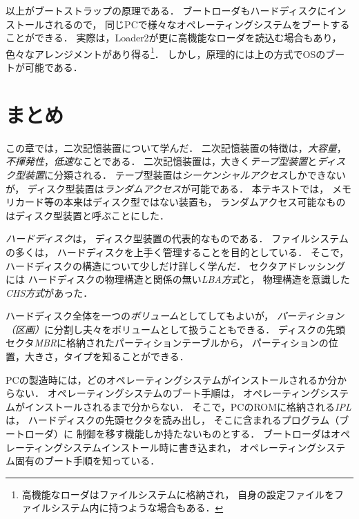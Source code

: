 以上がブートストラップの原理である．
ブートローダもハードディスクにインストールされるので，
同じPCで様々なオペレーティングシステムをブートすることができる．
実際は，Loader2が更に高機能なローダを読込む場合もあり，
色々なアレンジメントがあり得る\footnote{
高機能なローダはファイルシステムに格納され，
自身の設定ファイルをファイルシステム内に持つような場合もある．}．
しかし，原理的には上の方式でOSのブートが可能である．

\section{まとめ}
この章では，二次記憶装置について学んだ．
二次記憶装置の特徴は，\emph{大容量}，
\emph{不揮発性}，\emph{低速}なことである．
二次記憶装置は，大きく\emph{テープ型装置}と\emph{ディスク型装置}に分類される．
テープ型装置は\emph{シーケンシャルアクセス}しかできないが，
ディスク型装置は\emph{ランダムアクセス}が可能である．
本テキストでは，
メモリカード等の本来はディスク型ではない装置も，
ランダムアクセス可能なものはディスク型装置と呼ぶことにした．

\emph{ハードディスク}は，
ディスク型装置の代表的なものである．
ファイルシステムの多くは，
ハードディスクを上手く管理することを目的としている．
そこで，ハードディスクの構造について少しだけ詳しく学んだ．
セクタアドレッシングには
ハードディスクの物理構造と関係の無い\emph{LBA方式}と，
物理構造を意識した\emph{CHS方式}があった．

ハードディスク全体を一つの\emph{ボリューム}としてしてもよいが，
\emph{パーティション（区画）}に分割し夫々をボリュームとして扱うこともできる．
ディスクの先頭セクタ\emph{MBR}に格納されたパーティションテーブルから，
パーティションの位置，大きさ，タイプを知ることができる．

PCの製造時には，どのオペレーティングシステムがインストールされるか分からない．
オペレーティングシステムのブート手順は，
オペレーティングシステムがインストールされるまで分からない．
そこで，PCのROMに格納される\emph{IPL}は，
ハードディスクの先頭セクタを読み出し，
そこに含まれるプログラム（ブートローダ）に
制御を移す機能しか持たないものとする．
ブートローダはオペレーティングシステムインストール時に書き込まれ，
オペレーティングシステム固有のブート手順を知っている．

